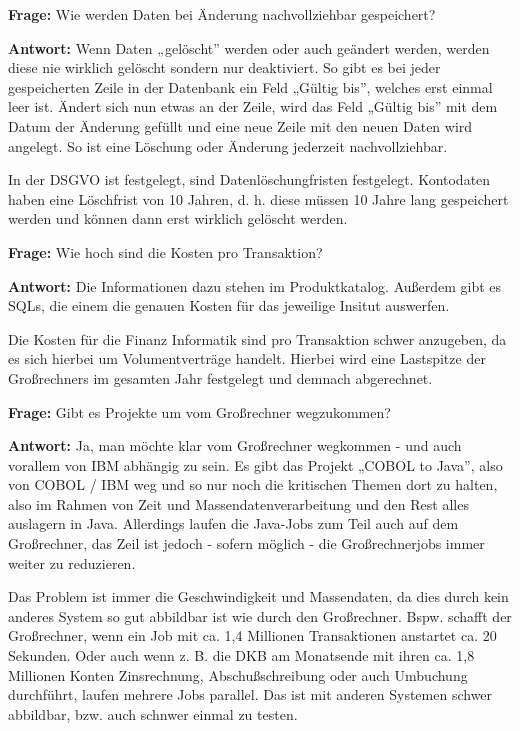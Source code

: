 \bigbreak
\bigbreak

\textbf{Frage:}
Wie werden Daten bei Änderung nachvollziehbar gespeichert?


\textbf{Antwort:}
Wenn Daten „gelöscht” werden oder auch geändert werden, werden diese nie wirklich gelöscht sondern nur deaktiviert.
So gibt es bei jeder gespeicherten Zeile in der Datenbank ein Feld „Gültig bis”, welches erst einmal leer ist. 
Ändert sich nun etwas an der Zeile, wird das Feld „Gültig bis” mit dem Datum der Änderung gefüllt und eine neue Zeile mit den neuen Daten wird angelegt.
So ist eine Löschung oder Änderung jederzeit nachvollziehbar.

In der DSGVO ist festgelegt, sind Datenlöschungfristen festgelegt.
Kontodaten haben eine Löschfrist von 10 Jahren, d. h. diese müssen 10 Jahre lang gespeichert werden und können dann erst wirklich gelöscht werden.

\bigbreak
\bigbreak

\textbf{Frage:}
Wie hoch sind die Kosten pro Transaktion?


\textbf{Antwort:} 
Die Informationen dazu stehen im Produktkatalog. Außerdem gibt es SQLs, die einem die genauen Kosten für das jeweilige Insitut auswerfen.

Die Kosten für die Finanz Informatik sind pro Transaktion schwer anzugeben, da es sich hierbei um Volumentverträge handelt. 
Hierbei wird eine Lastspitze der Großrechners im gesamten Jahr festgelegt und demnach abgerechnet. 


\bigbreak
\bigbreak

\textbf{Frage:}
Gibt es Projekte um vom Großrechner wegzukommen?


\textbf{Antwort:}
Ja, man möchte klar vom Großrechner wegkommen - und auch vorallem von IBM abhängig zu sein.
Es gibt das Projekt „COBOL to Java”, also von COBOL / IBM weg und so nur noch die kritischen Themen dort zu halten, also im Rahmen von Zeit und Massendatenverarbeitung und den Rest alles auslagern in Java.
Allerdings laufen die Java-Jobs zum Teil auch auf dem Großrechner, das Zeil ist jedoch - sofern möglich - die Großrechnerjobs immer weiter zu reduzieren.

Das Problem ist immer die Geschwindigkeit und Massendaten, da dies durch kein anderes System so gut abbildbar ist wie durch den Großrechner.
Bspw. schafft der Großrechner, wenn ein Job mit ca. 1,4 Millionen Transaktionen anstartet ca. 20 Sekunden.
Oder auch wenn z. B. die DKB am Monatsende mit ihren ca. 1,8 Millionen Konten Zinsrechnung, Abschußschreibung oder auch Umbuchung durchführt, laufen mehrere Jobs parallel.
Das ist mit anderen Systemen schwer abbildbar, bzw. auch schnwer einmal zu testen.

